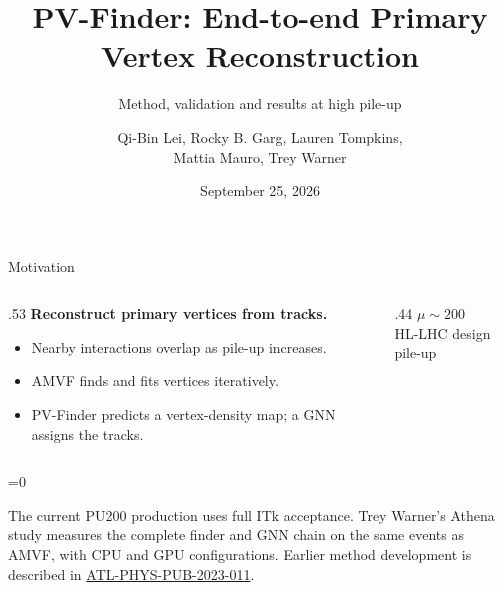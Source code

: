 \documentclass[xcolor=table,aspectratio=169]{beamer}
\title[PV-Finder]{PV-Finder: End-to-end Primary Vertex Reconstruction}
\subtitle{Method, validation and results at high pile-up}
\author[Mattia Mauro]{Qi-Bin Lei, Rocky B. Garg, Lauren Tompkins,\\\textcolor{pennred}{Mattia Mauro}, Trey Warner}
\institute[]{Stanford University}
\date{September 25, 2026}
\def\thisframelogos{}
\newcommand{\framelogo}[1]{\def\thisframelogos{#1}}
\providecommand{\talkbuild}{1}
\newcommand{\readingonly}[1]{\ifnum\talkbuild=0\relax#1\fi}
\newcommand{\readingnote}[1]{\readingonly{\par\vspace{.35em}%
  {\footnotesize\color{black!65}#1\par}}}
\newcommand{\bigvalue}[2]{{\LARGE\bfseries\textcolor{pennred}{#1}}\\[.4em]{\small #2}\par}
\newcommand{\pubnote}{\href{https://cds.cern.ch/record/2858348}{ATL-PHYS-PUB-2023-011}}
\begin{document}
\framelogo{}

\begin{frame}[plain]
    \titlepage
\end{frame}

\begin{frame}{Motivation}
    \relax
    \begin{columns}[c]
        \begin{column}{.53\linewidth}
            \textbf{Reconstruct primary vertices from tracks.}
            \par\vspace{1em}
            \begin{itemize}\setlength\itemsep{.7em}
                \item Nearby interactions overlap as pile-up increases.
                \item AMVF finds and fits vertices iteratively.
                \item PV-Finder predicts a vertex-density map; a GNN assigns the tracks.
            \end{itemize}
        \end{column}
        \begin{column}{.44\linewidth}\centering
            \bigvalue{$\mu\sim200$}{HL-LHC design pile-up}
            \par\vspace{1.5em}
        \end{column}
    \end{columns}
    \readingnote{The current PU200 production uses full ITk acceptance. Trey Warner's Athena study measures
        the complete finder and GNN chain on the same events as AMVF, with CPU and GPU configurations. Earlier
        method development is described in \pubnote.}
\end{frame}
\end{document}
